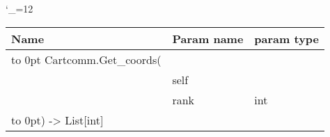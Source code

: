 \begingroup \catcode`\_=12 \tt
\begin{tabular}{lll}
\toprule
\textrm{Name}&\textrm{Param name}&\textrm{param type}\\
\midrule
\hbox to 0pt {Cartcomm.Get_coords(\hss}\\
& self\\
& rank & int\\
\hbox to 0pt{) -> List[int]\hss}\\
\bottomrule
\end{tabular}
\endgroup
